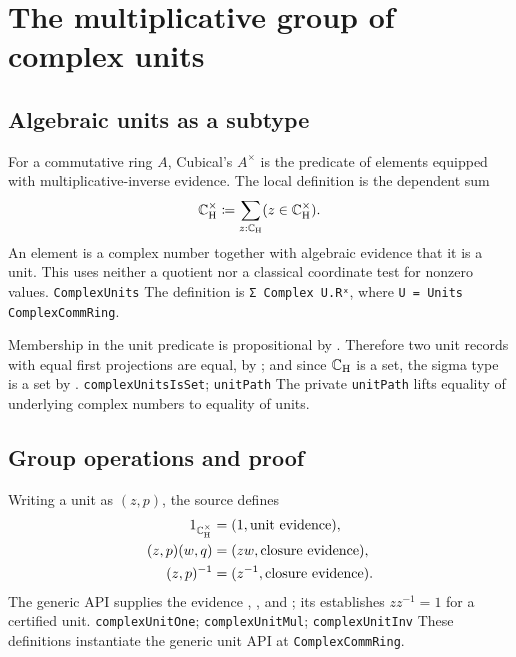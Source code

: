 \section{The multiplicative group of complex units}
\label{sec:units}

\subsection{Algebraic units as a subtype}
For a commutative ring $A$, Cubical's $A^{\times}$ is the predicate of
elements equipped with multiplicative-inverse evidence.  The local definition
is the dependent sum
\begin{equation}
 \mathbb{C}_{\mathrm H}^{\times}\coloneqq\sum_{z:\mathbb{C}_{\mathrm H}}(z\in\mathbb{C}_{\mathrm H}^{\times}).
 \label{eq:units-sigma}
\end{equation}
An element is a complex number together with algebraic evidence that it is a
unit.  This uses neither a quotient nor a classical coordinate test for
nonzero values.
{\texttt{ComplexUnits}}
{The definition is \texttt{Σ Complex U.Rˣ}, where \texttt{U = Units ComplexCommRing}.}

Membership in the unit predicate is propositional by .
Therefore two unit records with equal first projections are equal, by
; and since $\mathbb{C}_{\mathrm H}$ is a set, the sigma type is a set by
.
{\texttt{complexUnitsIsSet}; \texttt{unitPath}}
{The private \texttt{unitPath} lifts equality of underlying complex numbers to equality of units.}

\subsection{Group operations and proof}
Writing a unit as $(z,p)$, the source defines
\begin{align}
1_{\mathbb{C}_{\mathrm H}^{\times}}&=(1,\text{unit evidence}),\\
(z,p)(w,q)&=(zw,\text{closure evidence}),\\
(z,p)^{-1}&=(z^{-1},\text{closure evidence}).
\end{align}
The generic  API supplies the evidence
, , and ; its
 establishes $zz^{-1}=1$ for a certified unit.
{\texttt{complexUnitOne}; \texttt{complexUnitMul}; \texttt{complexUnitInv}}
{These definitions instantiate the generic unit API at \texttt{ComplexCommRing}.}


